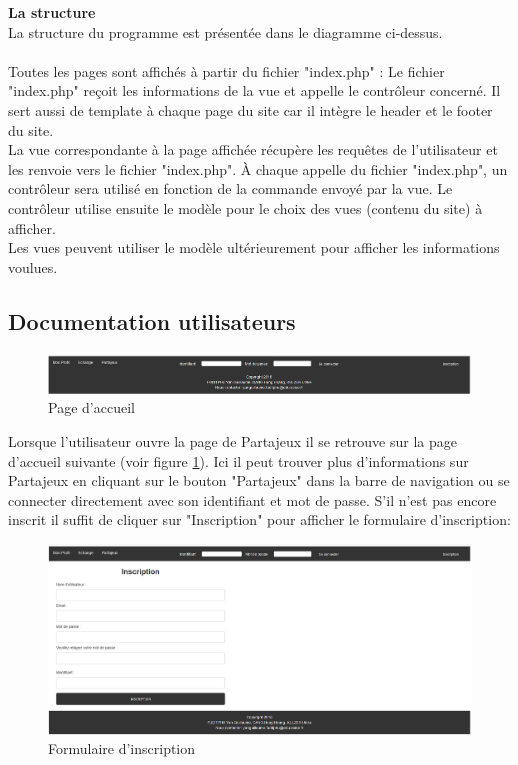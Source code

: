 \documentclass[a4paper,12pt,abstracton,titlepage]{scrartcl}
\begin{document}
\textbf{La structure}\\
La structure du programme est présentée dans le diagramme ci-dessus.\\
\\
Toutes les pages sont affichés à partir du fichier "index.php" : Le fichier "index.php" reçoit les informations de la vue et appelle le contrôleur concerné. Il sert aussi de template à chaque page du site car il intègre le header et le footer du site.\\
La vue correspondante à la page affichée récupère les requêtes de l'utilisateur et les renvoie vers le fichier "index.php". À chaque appelle du fichier "index.php", un contrôleur sera utilisé en fonction de la commande envoyé par la vue. Le contrôleur utilise ensuite le modèle pour le choix des vues (contenu du site) à afficher.\\
Les vues peuvent utiliser le modèle ultérieurement pour afficher les informations voulues.\\

\newpage
\subsection{Documentation utilisateurs}
\begin{figure}[h]
  \centering
    \includegraphics[width=\textwidth]{./doc/01_startscreen.png}
	\caption{Page d'accueil}
	\label{pdacc}
\end{figure}

Lorsque l'utilisateur ouvre la page de Partajeux il se retrouve sur la page d'accueil suivante (voir figure \ref{pdacc}). Ici il peut trouver plus d'informations sur Partajeux en cliquant sur le bouton "Partajeux" dans la barre de navigation ou se connecter directement avec son identifiant et mot de passe. S'il n'est pas encore inscrit il suffit de cliquer sur "Inscription" pour afficher le formulaire d'inscription:\\
\begin{figure}[h]
  \centering
    \includegraphics[width=\textwidth]{./doc/02_inscription.png}
	\caption{Formulaire d'inscription}
	\label{insc}
\end{figure}
\end{document}
